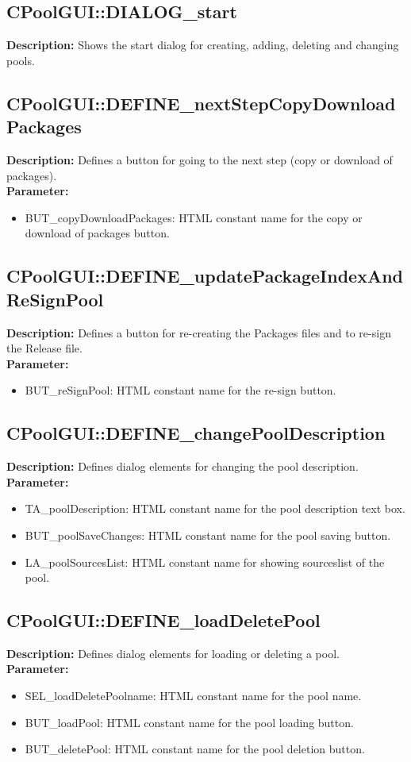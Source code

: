 \subsection{CPoolGUI::DIALOG\_start}
\textbf{Description:} Shows the start dialog for creating, adding, deleting and changing pools.\\

\subsection{CPoolGUI::DEFINE\_nextStepCopyDownloadPackages}
\textbf{Description:} Defines a button for going to the next step (copy or download of packages).\\
\textbf{Parameter:}
\begin{itemize}
\item BUT\_copyDownloadPackages: HTML constant name for the copy or download of packages button.
\end{itemize}

\subsection{CPoolGUI::DEFINE\_updatePackageIndexAndReSignPool}
\textbf{Description:} Defines a button for re-creating the Packages files and to re-sign the Release file.\\
\textbf{Parameter:}
\begin{itemize}
\item BUT\_reSignPool: HTML constant name for the re-sign button.
\end{itemize}

\subsection{CPoolGUI::DEFINE\_changePoolDescription}
\textbf{Description:} Defines dialog elements for changing the pool description.\\
\textbf{Parameter:}
\begin{itemize}
\item TA\_poolDescription: HTML constant name for the pool description text box.
\item BUT\_poolSaveChanges: HTML constant name for the pool saving button.
\item LA\_poolSourcesList: HTML constant name for showing sourceslist of the pool.
\end{itemize}

\subsection{CPoolGUI::DEFINE\_loadDeletePool}
\textbf{Description:} Defines dialog elements for loading or deleting a pool.\\
\textbf{Parameter:}
\begin{itemize}
\item SEL\_loadDeletePoolname: HTML constant name for the pool name.
\item BUT\_loadPool: HTML constant name for the pool loading button.
\item BUT\_deletePool: HTML constant name for the pool deletion button.
\end{itemize}

